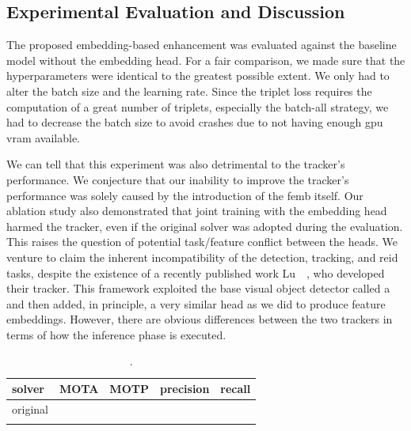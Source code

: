 \subsection{Experimental Evaluation and Discussion}

The proposed embedding-based enhancement was evaluated against the baseline model without the embedding head. For a fair comparison, we made sure that the hyperparameters were identical to the greatest possible extent. We only had to alter the batch size and the learning rate. Since the triplet loss requires the computation of a great number of triplets, especially the batch-all strategy, we had to decrease the batch size to avoid crashes due to not having enough \gls{gpu} \gls{vram} available.


We can tell that this experiment was also detrimental to the tracker's performance. We conjecture that our inability to improve the tracker's performance was solely caused by the introduction of the \gls{femb} itself. Our ablation study also demonstrated that joint training with the embedding head harmed the tracker, even if the original solver was adopted during the evaluation. This raises the question of potential task/feature conflict between the heads. We venture to claim the inherent incompatibility of the detection, tracking, and \gls{reid} tasks, despite the existence of a recently published work Lu~\etal{}~\cite{lu2020retinatrack}, who developed their \retinatrack{} tracker. This framework exploited the base visual object detector called a \retinanet{}~\cite{lin2018focal} and then added, in principle, a very similar head as we did to produce feature embeddings. However, there are obvious differences between the two trackers in terms of how the inference phase is executed.

\begin{table}[!t]
    \centering
    \begin{tabular}{lllll}
        \toprule
        \textbf{solver} & \textbf{MOTA} & \textbf{MOTP} & \textbf{precision} & \textbf{recall} \\
        \midrule
        original        &               &               &                    &                 \\
        \featurenms{}   &               &               &                    &                 \\
        \bottomrule
    \end{tabular}
    \caption[Original \gls{siammot} solver vs. \featurenms{}]{.}
    \label{tab:OrigSolverVsFeatureNMS}
\end{table}

